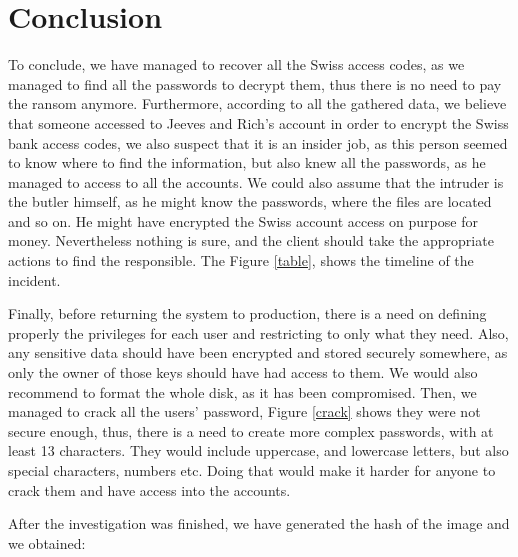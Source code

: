 \documentclass[a4paper,12pt]{article}
\begin{document}
 




\section{Conclusion}

To conclude, we have managed to recover all the Swiss access codes, as we managed to find all the passwords to decrypt them, thus there is no need to pay the ransom anymore. Furthermore, according to all the gathered data, we believe that someone accessed to Jeeves and Rich's account in order to encrypt the Swiss bank access codes, we also suspect that it is an insider job, as this person seemed to know where to find the information, but also knew all the passwords, as he managed to access to all the accounts. We could also assume that the intruder is the butler himself, as he might know the passwords, where the files are located and so on. He might have encrypted the Swiss account access on purpose for money. Nevertheless nothing is sure, and the client should take the appropriate actions to find the responsible. The Figure \ref{table}, shows the timeline of the incident. 

Finally, before returning the system to production, there is a need on defining properly the privileges for each user and restricting to only what they need. Also, any sensitive data should have been encrypted and stored securely somewhere, as only the owner of those keys should have had access to them. We would also recommend to format the whole disk, as it has been compromised. Then, we managed to crack all the users' password, Figure \ref{crack} shows they were not secure enough, thus, there is a need to create more complex passwords, with at least 13 characters. They would include uppercase, and lowercase letters, but also special characters, numbers etc. Doing that would make it harder for anyone to crack them and have access into the accounts. 

After the investigation was finished, we have generated the hash of the image and we obtained: 
\end{document}
